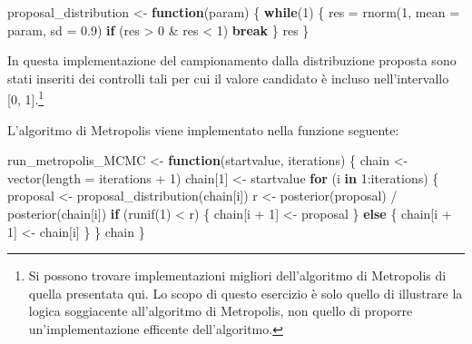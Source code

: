 \documentclass[
]{memoir}
\newenvironment{Shaded}{\begin{snugshade}}{\end{snugshade}}
\newcommand{\AttributeTok}[1]{\textcolor[rgb]{0.77,0.63,0.00}{#1}}
\newcommand{\ControlFlowTok}[1]{\textcolor[rgb]{0.13,0.29,0.53}{\textbf{#1}}}
\newcommand{\DecValTok}[1]{\textcolor[rgb]{0.00,0.00,0.81}{#1}}
\newcommand{\FloatTok}[1]{\textcolor[rgb]{0.00,0.00,0.81}{#1}}
\newcommand{\FunctionTok}[1]{\textcolor[rgb]{0.00,0.00,0.00}{#1}}
\newcommand{\NormalTok}[1]{#1}
\newcommand{\OtherTok}[1]{\textcolor[rgb]{0.56,0.35,0.01}{#1}}
\newcommand{\SpecialCharTok}[1]{\textcolor[rgb]{0.00,0.00,0.00}{#1}}
\begin{document}
\begin{Shaded}
\begin{Highlighting}[]
\NormalTok{proposal\_distribution }\OtherTok{\textless{}{-}} \ControlFlowTok{function}\NormalTok{(param) \{}
  \ControlFlowTok{while}\NormalTok{(}\DecValTok{1}\NormalTok{) \{}
\NormalTok{    res }\OtherTok{=} \FunctionTok{rnorm}\NormalTok{(}\DecValTok{1}\NormalTok{, }\AttributeTok{mean =}\NormalTok{ param, }\AttributeTok{sd =} \FloatTok{0.9}\NormalTok{)}
    \ControlFlowTok{if}\NormalTok{ (res }\SpecialCharTok{\textgreater{}} \DecValTok{0} \SpecialCharTok{\&}\NormalTok{ res }\SpecialCharTok{\textless{}} \DecValTok{1}\NormalTok{)}
      \ControlFlowTok{break}
\NormalTok{  \}}
\NormalTok{  res}
\NormalTok{\}}
\end{Highlighting}
\end{Shaded}

In questa implementazione del campionamento dalla distribuzione proposta sono stati inseriti dei controlli tali per cui il valore candidato è incluso nell'intervallo {[}0, 1{]}.\footnote{Si possono trovare implementazioni migliori dell'algoritmo di Metropolis di quella presentata qui. Lo scopo di questo esercizio è solo quello di illustrare la logica soggiacente all'algoritmo di Metropolis, non quello di proporre un'implementazione efficente dell'algoritmo.}

L'algoritmo di Metropolis viene implementato nella funzione seguente:

\begin{Shaded}
\begin{Highlighting}[]
\NormalTok{run\_metropolis\_MCMC }\OtherTok{\textless{}{-}} \ControlFlowTok{function}\NormalTok{(startvalue, iterations) \{}
\NormalTok{  chain }\OtherTok{\textless{}{-}} \FunctionTok{vector}\NormalTok{(}\AttributeTok{length =}\NormalTok{ iterations }\SpecialCharTok{+} \DecValTok{1}\NormalTok{)}
\NormalTok{  chain[}\DecValTok{1}\NormalTok{] }\OtherTok{\textless{}{-}}\NormalTok{ startvalue}
  \ControlFlowTok{for}\NormalTok{ (i }\ControlFlowTok{in} \DecValTok{1}\SpecialCharTok{:}\NormalTok{iterations) \{}
\NormalTok{    proposal }\OtherTok{\textless{}{-}} \FunctionTok{proposal\_distribution}\NormalTok{(chain[i])}
\NormalTok{    r }\OtherTok{\textless{}{-}} \FunctionTok{posterior}\NormalTok{(proposal) }\SpecialCharTok{/} \FunctionTok{posterior}\NormalTok{(chain[i])}
    \ControlFlowTok{if}\NormalTok{ (}\FunctionTok{runif}\NormalTok{(}\DecValTok{1}\NormalTok{) }\SpecialCharTok{\textless{}}\NormalTok{ r) \{}
\NormalTok{      chain[i }\SpecialCharTok{+} \DecValTok{1}\NormalTok{] }\OtherTok{\textless{}{-}}\NormalTok{ proposal}
\NormalTok{    \} }\ControlFlowTok{else}\NormalTok{ \{}
\NormalTok{      chain[i }\SpecialCharTok{+} \DecValTok{1}\NormalTok{] }\OtherTok{\textless{}{-}}\NormalTok{ chain[i]}
\NormalTok{    \}}
\NormalTok{  \}}
\NormalTok{  chain}
\NormalTok{\}}
\end{Highlighting}
\end{Shaded}
\end{document}
